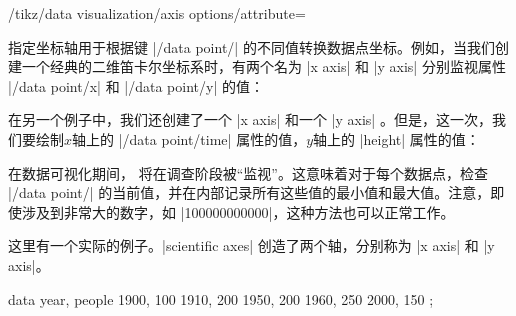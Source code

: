 \begin{key}{/tikz/data visualization/axis options/attribute=} %

    指定坐标轴用于根据键 |/data point/| 的不同值转换数据点坐标。例如，当我们创建一个经典的二维笛卡尔坐标系时，有两个名为 |x axis| 和 |y axis| 分别监视属性 |/data point/x| 和 |/data point/y| 的值：
\begin{codeexample}
\end{codeexample}
    在另一个例子中，我们还创建了一个 |x axis| 和一个 |y axis| 。但是，这一次，我们要绘制$x$轴上的 |/data point/time| 属性的值，$y$轴上的 |height| 属性的值：
\begin{codeexample}
\end{codeexample}
    在数据可视化期间， 将在调查阶段被``监视''。这意味着对于每个数据点，检查 |/data point/| 的当前值，并在内部记录所有这些值的最小值和最大值。注意，即使涉及到非常大的数字，如 |100000000000|，这种方法也可以正常工作。


    这里有一个实际的例子。|scientific axes| 创造了两个轴，分别称为 |x axis| 和 |y axis|。
\begin{codeexample}[preamble={\usetikzlibrary{datavisualization}}]
\tikz \datavisualization [scientific axes,
                          x axis={attribute=people, length=2.5cm, ticks=few},
                          y axis={attribute=year},
                          visualize as scatter]
  data {
    year, people
    1900, 100
    1910, 200
    1950, 200
    1960, 250
    2000, 150
  };
\end{codeexample}
\end{key}


